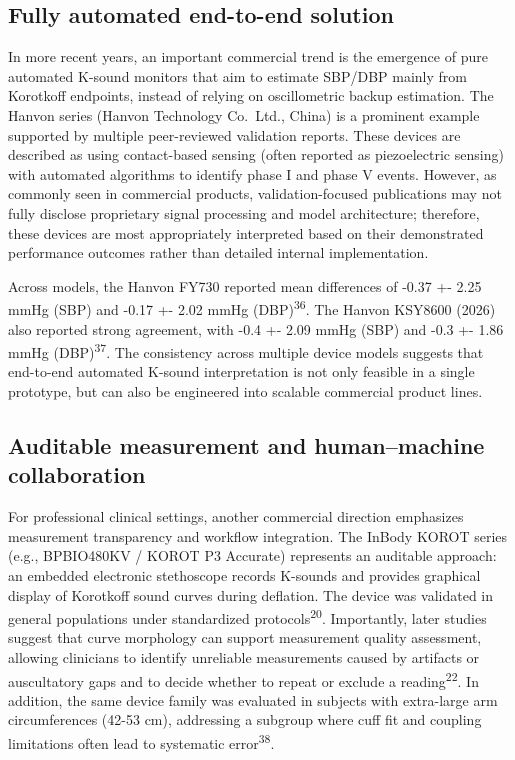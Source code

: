 \documentclass[
  12pt,
  letterpaper,
  openany,
  oneside]{book}
\begin{document}
\subsection{Fully automated end-to-end
solution}\label{fully-automated-end-to-end-solution}

In more recent years, an important commercial trend is the emergence of
pure automated K-sound monitors that aim to estimate SBP/DBP mainly from
Korotkoff endpoints, instead of relying on oscillometric backup
estimation. The Hanvon series (Hanvon Technology Co.~Ltd., China) is a
prominent example supported by multiple peer-reviewed validation
reports. These devices are described as using contact-based sensing
(often reported as piezoelectric sensing) with automated algorithms to
identify phase I and phase V events. However, as commonly seen in
commercial products, validation-focused publications may not fully
disclose proprietary signal processing and model architecture;
therefore, these devices are most appropriately interpreted based on
their demonstrated performance outcomes rather than detailed internal
implementation.

Across models, the Hanvon FY730 reported mean differences of -0.37 +-
2.25 mmHg (SBP) and -0.17 +- 2.02 mmHg (DBP)\textsuperscript{36}. The
Hanvon KSY8600 (2026) also reported strong agreement, with -0.4 +- 2.09
mmHg (SBP) and -0.3 +- 1.86 mmHg (DBP)\textsuperscript{37}. The
consistency across multiple device models suggests that end-to-end
automated K-sound interpretation is not only feasible in a single
prototype, but can also be engineered into scalable commercial product
lines.

\subsection{Auditable measurement and human--machine
collaboration}\label{auditable-measurement-and-humanmachine-collaboration}

For professional clinical settings, another commercial direction
emphasizes measurement transparency and workflow integration. The InBody
KOROT series (e.g., BPBIO480KV / KOROT P3 Accurate) represents an
auditable approach: an embedded electronic stethoscope records K-sounds
and provides graphical display of Korotkoff sound curves during
deflation. The device was validated in general populations under
standardized protocols\textsuperscript{20}. Importantly, later studies
suggest that curve morphology can support measurement quality
assessment, allowing clinicians to identify unreliable measurements
caused by artifacts or auscultatory gaps and to decide whether to repeat
or exclude a reading\textsuperscript{22}. In addition, the same device
family was evaluated in subjects with extra-large arm circumferences
(42-53 cm), addressing a subgroup where cuff fit and coupling
limitations often lead to systematic error\textsuperscript{38}.
\end{document}
